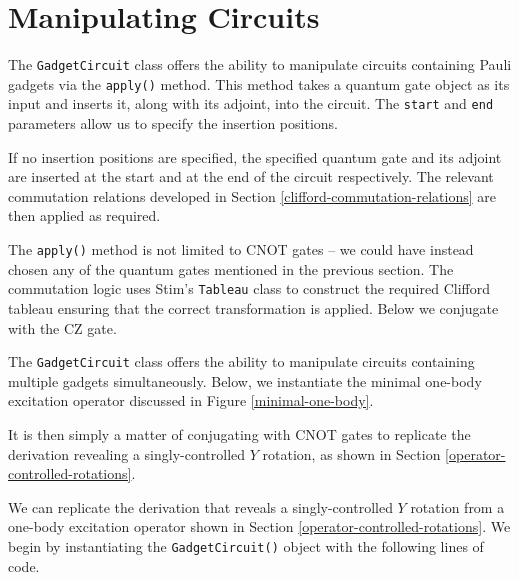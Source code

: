 \section{Manipulating Circuits}%
\label{manipulating-circuits}

The \lstinline{GadgetCircuit} class offers the ability to manipulate circuits containing Pauli gadgets via the \lstinline{apply()} method. This method takes a quantum gate object as its input and inserts it, along with its adjoint, into the circuit. The \lstinline{start} and \lstinline{end} parameters allow us to specify the insertion positions.


If no insertion positions are specified, the specified quantum gate and its adjoint are inserted at the start and at the end of the circuit respectively. The relevant commutation relations developed in Section \ref{clifford-commutation-relations} are then applied as required.


The \lstinline{apply()} method is not limited to CNOT gates -- we could have instead chosen any of the quantum gates mentioned in the previous section. The commutation logic uses Stim's \lstinline{Tableau} class to construct the required Clifford tableau ensuring that the correct transformation is applied. Below we conjugate with the CZ gate.


The \lstinline{GadgetCircuit} class offers the ability to manipulate circuits containing multiple gadgets simultaneously. Below, we instantiate the minimal one-body excitation operator discussed in Figure \ref{minimal-one-body}.


It is then simply a matter of conjugating with CNOT gates to replicate the derivation revealing a singly-controlled $Y$ rotation, as shown in Section \ref{operator-controlled-rotations}.


We can replicate the derivation that reveals a singly-controlled $Y$ rotation from a one-body excitation operator shown in Section \ref{operator-controlled-rotations}. We begin by instantiating the \lstinline{GadgetCircuit()} object with the following lines of code.

